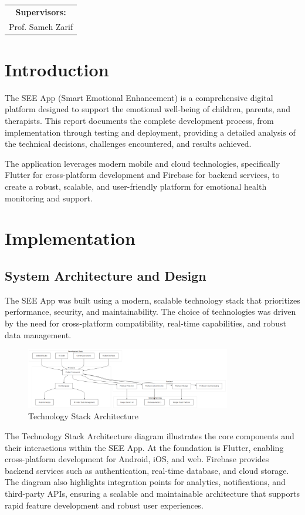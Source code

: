 \documentclass[12pt,a4paper]{article}
\newcommand{\chaptertitle}[1]{\section{#1}}
\newcommand{\sectiontitle}[1]{\subsection{#1}}
\begin{document}
\begin{titlepage}
    \begin{tabular}{c}
        \textbf{Supervisors:} \\
        Prof. Sameh Zarif \\
    \end{tabular}

\end{titlepage}

\tableofcontents
\newpage

\listoffigures
\newpage

\setcounter{section}{4}

\chaptertitle{Introduction}

The SEE App (Smart Emotional Enhancement) is a comprehensive digital platform designed to support the emotional well-being of children, parents, and therapists. This report documents the complete development process, from implementation through testing and deployment, providing a detailed analysis of the technical decisions, challenges encountered, and results achieved.

The application leverages modern mobile and cloud technologies, specifically Flutter for cross-platform development and Firebase for backend services, to create a robust, scalable, and user-friendly platform for emotional health monitoring and support.

\newpage

\chaptertitle{Implementation}

\sectiontitle{System Architecture and Design}

The SEE App was built using a modern, scalable technology stack that prioritizes performance, security, and maintainability. The choice of technologies was driven by the need for cross-platform compatibility, real-time capabilities, and robust data management.

\begin{figure}[H]
    \centering
    \includegraphics[width=0.8\textwidth,height=0.24\textwidth,keepaspectratio]{redrawn_diagrams/Figure1_Technology_Stack_Architecture.png}
    \caption{Technology Stack Architecture}
    \label{fig:tech-stack}
\end{figure}
\vspace{0.5em}
The Technology Stack Architecture diagram illustrates the core components and their interactions within the SEE App. At the foundation is Flutter, enabling cross-platform development for Android, iOS, and web. Firebase provides backend services such as authentication, real-time database, and cloud storage. The diagram also highlights integration points for analytics, notifications, and third-party APIs, ensuring a scalable and maintainable architecture that supports rapid feature development and robust user experiences.
\end{document}
